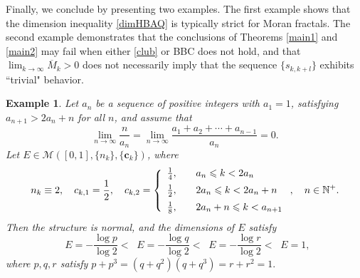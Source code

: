 \documentclass[12pt]{amsart}
\numberwithin{equation}{section}
\theoremstyle{plain}
\newtheorem{example}{Example}[section]
\theoremstyle{remark}
\theoremstyle{definition}
\newcommand{\om}{\overline{M}}
\newcommand{\N}{\mathbb{N}}
\newcommand{\ccc}{\mathbf{c}}
\newcommand{\f}{\frac}
\renewcommand{\le}{\leqslant}
\DeclareMathOperator{\dimh}{dim_H}
\DeclareMathOperator{\odimb}{\overline{dim}_B}
\DeclareMathOperator{\dima}{dim_A}
\DeclareMathOperator{\dimqa}{dim_{qA}}
\begin{document}
Finally, we conclude by presenting two examples. The first example shows that the dimension inequality \eqref{dimHBAQ} is typically strict for Moran fractals. The second example demonstrates that the conclusions of Theorems \ref{main1} and \ref{main2} may fail when either \eqref{club} or BBC does not hold, and that
	$\lim_{k\to\infty} \om_k>0$ does not necessarily imply that the sequence $\{s_{k,k+l}\}$ exhibits ``trivial" behavior.  	
	\begin{example}\label{exa'}
		Let ${a_n}$ be a sequence of positive integers with $a_1=1$, satisfying $a_{n+1}>2a_n+n$ for all $n$, and assume that
		\[
		\lim_{n\to\infty}\f n{a_n}=\lim_{n\to\infty}\f {a_1+a_2+\cdots+a_{n-1}}{a_n}=0.
		\]
		Let $E\in \mathcal{M}([0,1],\{n_k\},\{\ccc_{k}\})$, where
		\[
		n_k\equiv 2,\quad c_{k,1}=\f12,\quad c_{k,2}=\left\{\begin{array}{ll}
			\f 14,\quad & a_n\le k<2a_n\vspace{0.5em}\\
			\f12, & 2a_n\le k<2a_n+n\vspace{0.5em}\\
			\f18, & 2a_n+n\le k<a_{n+1}
		\end{array}
		\right.,\quad n\in\N^+.
		\]
		Then the structure is normal, and the dimensions of $E$ satisfy
		\[
		\dimh E=-\f{\log p}{\log 2}<\odimb E=-\f{\log q}{\log 2}<\dimqa E=-\f{\log r}{\log 2}<\dima E=1,
		\]
		where $p,q,r$ satisfy $p+p^3=(q+q^2)(q+q^3)=r+r^2=1.$
	\end{example}
	
\end{document}
